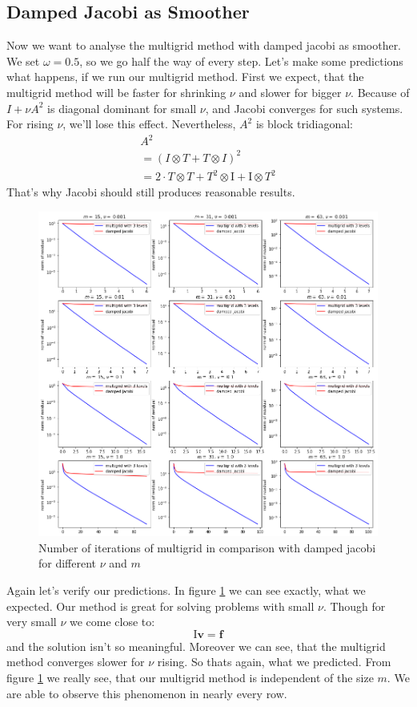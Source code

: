 \documentclass{amsart}
\theoremstyle{definition}
\theoremstyle{remark}
\numberwithin{equation}{section}
\newcommand{\Id}{\mathrm{I}}
\renewcommand{\vec}{\textbf}
\begin{document}
\subsection{Damped Jacobi as Smoother}
Now we want to analyse the multigrid method with damped jacobi as smoother. We set $\omega= 0.5$, so we go half the way of every step. Let's make some predictions what happens, if we run our multigrid method. First we expect, that the multigrid method will be faster for shrinking $\nu$ and slower for bigger $\nu$. Because of $I + \nu A^2$ is diagonal dominant for small $\nu$, and Jacobi converges for such systems. For rising $\nu$, we'll lose this effect. Nevertheless, $A^2$ is block tridiagonal:
\begin{align*}
A^2\\
= (I \otimes T + T \otimes I)^2 \\
= 2  \cdot T \otimes T + T^2 \otimes \Id + \Id \otimes T^2 
\end{align*}
That's why Jacobi should still produces reasonable results. 
\begin{figure}[h!]
	\centering
	\includegraphics[scale=0.4]{./imgs/multigrid_jac_comparison_tiny}
	\caption{Number of iterations of multigrid in comparison with damped jacobi for different $\nu$ and $m$}
	\label{fig: multigridJacobi}
\end{figure}

Again let's verify our predictions. In figure \ref{fig: multigridJacobi} we can see exactly, what we expected. Our method is great for solving problems with small $\nu$. Though for very small $\nu$ we come close to:
\[
\Id   \vec{v} = \vec{f}
\] 
and the solution isn't so meaningful.
Moreover we can see, that the multigrid method converges slower for $\nu$ rising. So thats again, what we predicted. From figure \ref*{fig: multigridJacobi} we really see, that our multigrid method is independent of the size $m$. We are able to observe this phenomenon in nearly every row.
\end{document}
